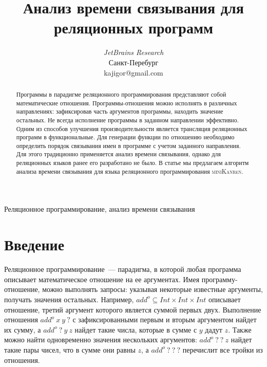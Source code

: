 \documentclass[conference]{IEEEtran}
\begin{document}
\newcommand{\miniKanren}{\textsc{miniKanren}}
\newcommand{\mercury}{\textsc{Mercury}}
\newcommand{\haskell}{\textsc{Haskell}}
\newcommand{\prolog}{\textsc{Prolog}}
\newcommand{\scheme}{\textsc{Scheme}}


\title{Анализ времени связывания для реляционных программ}

\author{
\and
{}
\textit{JetBrains Research}\\
Санкт-Перебург \\
kajigor@gmail.com}


\maketitle

\begin{abstract}
Программы в парадигме реляционного программирования представляют собой математические отношения.
Программы-отношения можно исполнять в различных направлениях: зафиксировав часть аргументов программы, находить значение остальных.
Не всегда исполнение программы в заданном направлении эффективно. 
Одним из способов улучшения производительности является трансляция реляционных программ в функциональные. 
Для генерации функции по отношению необходимо определить порядок связывания имен в программе с учетом заданного направления.
Для этого традиционно применяется анализ времени связывания, однако для реляционных языков ранее его разработано не было.
В статье мы предлагаем алгоритм анализа времени связывания для языка реляционного программирования \miniKanren{}. 
\end{abstract}

\begin{IEEEkeywords}
Реляционное программирование, анализ времени связывания
\end{IEEEkeywords}

\section{Введение}

Реляционное программирование~--- парадигма, в которой любая программа описывает математическое отношение на ее аргументах. 
Имея программу-отношение, можно выполнять запросы: указывая некоторые известные аргументы, получать значения остальных.
Например, $add^o \subseteq Int \times Int \times Int$ описывает отношение, третий аргумент которого является суммой первых двух. 
Выполнение отношения $add^o  \ x \ y \ ?$ с зафиксированными первым и вторым аргументом найдет их сумму, а $add^o \ ? \ y \ z$ найдет такие числа, которые в сумме с $y$ дадут $z$. 
Также можно найти одновременно значения нескольких аргументов: $add^o \ ? \ ? \ z$ найдет такие пары чисел, что в сумме они равны $z$, а $add^o \ ? \ ? \ ?$ перечислит все тройки из отношения. 
\end{document}
